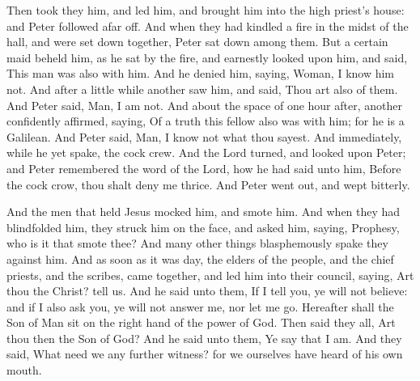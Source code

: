 Then took they him, and led him, and brought him into the high priest's house: and Peter followed afar off. And when they had kindled a fire in the midst of the hall, and were set down together, Peter sat down among them. But a certain maid beheld him, as he sat by the fire, and earnestly looked upon him, and said, This man was also with him. And he denied him, saying, Woman, I know him not. And after a little while another saw him, and said, Thou art also of them. And Peter said, Man, I am not. And about the space of one hour after, another confidently affirmed, saying, Of a truth this fellow also was with him; for he is a Galilean. And Peter said, Man, I know not what thou sayest. And immediately, while he yet spake, the cock crew. And the Lord turned, and looked upon Peter; and Peter remembered the word of the Lord, how he had said unto him, Before the cock crow, thou shalt deny me thrice. And Peter went out, and wept bitterly.

And the men that held Jesus mocked him, and smote him. And when they had blindfolded him, they struck him on the face, and asked him, saying, Prophesy, who is it that smote thee? And many other things blasphemously spake they against him. And as soon as it was day, the elders of the people, and the chief priests, and the scribes, came together, and led him into their council, saying, Art thou the Christ? tell us. And he said unto them, If I tell you, ye will not believe: and if I also ask you, ye will not answer me, nor let me go. Hereafter shall the Son of Man sit on the right hand of the power of God. Then said they all, Art thou then the Son of God? And he said unto them, Ye say that I am. And they said, What need we any further witness? for we ourselves have heard of his own mouth.

\subsection{}  %

\smallskip
{}


